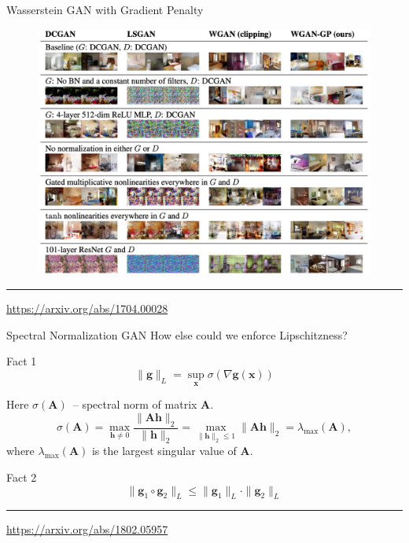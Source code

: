 \documentclass{beamer}
\newcommand{\bh}{\mathbf{h}}
\newcommand{\bx}{\mathbf{x}}
\newcommand{\bA}{\mathbf{A}}
\begin{document}
\begin{frame}{Wasserstein GAN with Gradient Penalty}
	\begin{figure}
		\centering
		\includegraphics[width=0.95\linewidth]{figs/wgan_gp_results}
	\end{figure}
	\vfill
	\hrule\medskip 
	{\scriptsize \href{https://arxiv.org/abs/1704.00028}{https://arxiv.org/abs/1704.00028}}
	
\end{frame}
\begin{frame}{Spectral Normalization GAN}
	How else could we enforce Lipschitzness?
	\begin{block}{Fact 1}
		\vspace{-0.3cm}
		\[
			\| \mathbf{g} \|_L = \sup_\bx \sigma( \nabla \mathbf{g}(\bx))
		\]
	\end{block}
	Here $\sigma(\bA)$~-- spectral norm of matrix $\bA$.
	\[
		\sigma(\bA) = \max_{\bh \neq 0} \frac{\|\bA \bh\|_2}{\|\bh\|_2} = \max_{\|\bh\|_2 \leq 1} \| \bA \bh \|_2 = \lambda_{\text{max}}(\bA),
	\]
	where $\lambda_{\text{max}}(\bA)$ is the largest singular value of $\bA$.
	\begin{block}{Fact 2}
		\vspace{-0.3cm}
		\[
			\| \mathbf{g}_1 \circ \mathbf{g}_2 \|_L \leq \| \mathbf{g}_1 \|_L \cdot \| \mathbf{g}_2\|_L
		\]
	\end{block}
	\vfill
	\hrule\medskip 
	{\scriptsize \href{https://arxiv.org/abs/1802.05957}{https://arxiv.org/abs/1802.05957}}
	
\end{frame}
\end{document}
